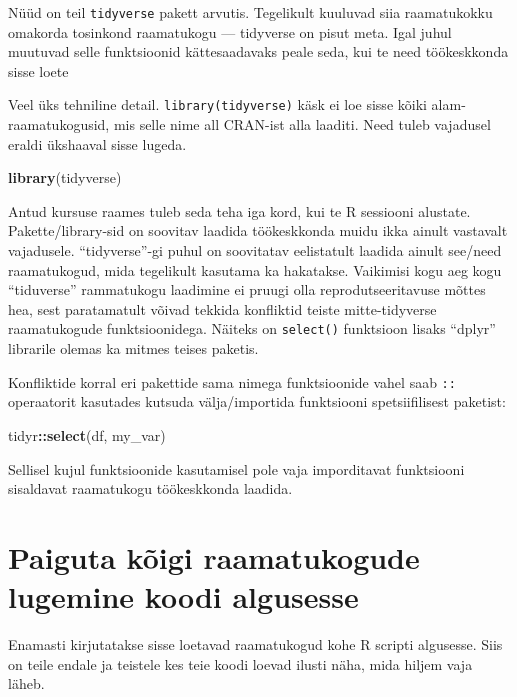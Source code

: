 \documentclass[]{book}
\newenvironment{Shaded}{\begin{snugshade}}{\end{snugshade}}
\newcommand{\KeywordTok}[1]{\textcolor[rgb]{0.13,0.29,0.53}{\textbf{#1}}}
\newcommand{\OperatorTok}[1]{\textcolor[rgb]{0.81,0.36,0.00}{\textbf{#1}}}
\newcommand{\NormalTok}[1]{#1}
\begin{document}
Nüüd on teil \texttt{tidyverse} pakett arvutis. Tegelikult kuuluvad siia
raamatukokku omakorda tosinkond raamatukogu --- tidyverse on pisut meta.
Igal juhul muutuvad selle funktsioonid kättesaadavaks peale seda, kui te
need töökeskkonda sisse loete

Veel üks tehniline detail. \texttt{library(tidyverse)} käsk ei loe sisse
kõiki alam-raamatukogusid, mis selle nime all CRAN-ist alla laaditi.
Need tuleb vajadusel eraldi ükshaaval sisse lugeda.

\begin{Shaded}
\begin{Highlighting}[]
\KeywordTok{library}\NormalTok{(tidyverse)}
\end{Highlighting}
\end{Shaded}

Antud kursuse raames tuleb seda teha iga kord, kui te R sessiooni
alustate. Pakette/library-sid on soovitav laadida töökeskkonda muidu
ikka ainult vastavalt vajadusele. ``tidyverse''-gi puhul on soovitatav
eelistatult laadida ainult see/need raamatukogud, mida tegelikult
kasutama ka hakatakse. Vaikimisi kogu aeg kogu ``tiduverse'' rammatukogu
laadimine ei pruugi olla reprodutseeritavuse mõttes hea, sest
paratamatult võivad tekkida konfliktid teiste mitte-tidyverse
raamatukogude funktsioonidega. Näiteks on \texttt{select()} funktsioon
lisaks ``dplyr'' librarile olemas ka mitmes teises paketis.

Konfliktide korral eri pakettide sama nimega funktsioonide vahel saab
\texttt{::} operaatorit kasutades kutsuda välja/importida funktsiooni
spetsiifilisest paketist:

\begin{Shaded}
\begin{Highlighting}[]
\NormalTok{tidyr}\OperatorTok{::}\KeywordTok{select}\NormalTok{(df, my_var)}
\end{Highlighting}
\end{Shaded}

Sellisel kujul funktsioonide kasutamisel pole vaja imporditavat
funktsiooni sisaldavat raamatukogu töökeskkonda laadida.

\section{Paiguta kõigi raamatukogude lugemine koodi
algusesse}\label{paiguta-koigi-raamatukogude-lugemine-koodi-algusesse}

Enamasti kirjutatakse sisse loetavad raamatukogud kohe R scripti
algusesse. Siis on teile endale ja teistele kes teie koodi loevad ilusti
näha, mida hiljem vaja läheb.
\end{document}
